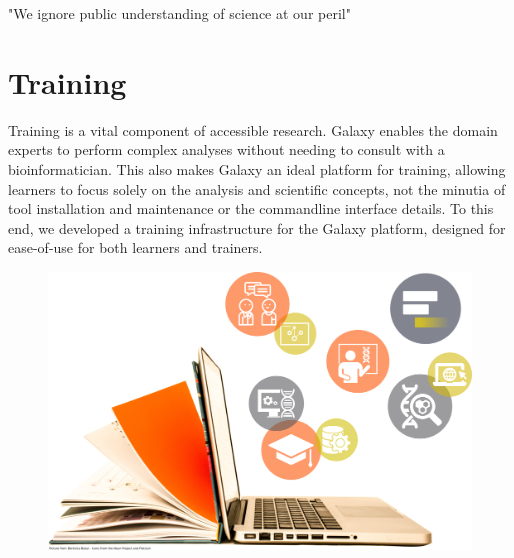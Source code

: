 \begin{savequote}[75mm]
"We ignore public understanding of science at our peril"
\end{savequote}

\chapter{Training}\label{chapter:training}

Training is a vital component of accessible research. Galaxy enables the domain experts to perform complex analyses without needing to consult with a bioinformatician. This also makes Galaxy an ideal platform for training, allowing learners to focus solely on the analysis and scientific concepts, not the minutia of tool installation and maintenance or the commandline interface details. To this end, we developed a training infrastructure for the Galaxy platform, designed for ease-of-use for both learners and trainers.

\begin{figure}[t!]
\includegraphics[scale=0.1]{chapters/images/training-coverart.jpg}
\end{figure}
\setcounter{figure}{-1}
\setcounter{table}{-1}
\setcounter{section}{-1}
